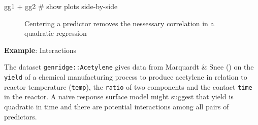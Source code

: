 \documentclass[
  letterpaper,
  10pt,
  krantz2]{krantz}
\makeatletter
\newenvironment{Shaded}{\begin{snugshade}}{\end{snugshade}}
\newcommand{\CommentTok}[1]{\textcolor[rgb]{0.37,0.37,0.37}{#1}}
\newcommand{\NormalTok}[1]{\textcolor[rgb]{0.00,0.23,0.31}{#1}}
\newcommand{\SpecialCharTok}[1]{\textcolor[rgb]{0.37,0.37,0.37}{#1}}
\newenvironment{kframe}{%
  \medskip{}
  \setlength{\fboxsep}{.8em}
  \def\at@end@of@kframe{}%
  \ifinner\ifhmode%
  \def\at@end@of@kframe{\end{minipage}}%
  \begin{minipage}{\columnwidth}%
  \fi\fi%
  \def\FrameCommand##1{\hskip\@totalleftmargin \hskip-\fboxsep
  \colorbox{shadecolor}{##1}\hskip-\fboxsep
      \hskip-\linewidth \hskip-\@totalleftmargin \hskip\columnwidth}%
  \MakeFramed {\advance\hsize-\width
    \@totalleftmargin\z@ \linewidth\hsize
    \@setminipage}}%
{\par\unskip\endMakeFramed%
  \at@end@of@kframe}
\renewenvironment{Shaded}{\begin{kframe}}{\end{kframe}}
\makeatother
\begin{document}
\begin{Shaded}
\begin{Highlighting}[]
\NormalTok{gg1 }\SpecialCharTok{+}\NormalTok{ gg2         }\CommentTok{\# show plots side{-}by{-}side}
\end{Highlighting}
\end{Shaded}

\begin{figure}[H]


\caption{\label{fig-collin-centering}Centering a predictor removes the
nessessary correlation in a quadratic regression}

\end{figure}%

\textbf{Example}: Interactions

The dataset \texttt{genridge::Acetylene} gives data from Marquardt \&
Snee () on the \texttt{yield} of a
chemical manufacturing process to produce acetylene in relation to
reactor temperature (\texttt{temp}), the \texttt{ratio} of two
components and the contact \texttt{time} in the reactor. A naive
response surface model might suggest that yield is quadratic in time and
there are potential interactions among all pairs of predictors.
\end{document}
